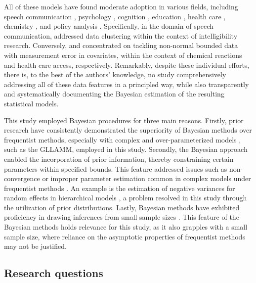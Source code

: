 \documentclass[
  authoryear,
  preprint,
  1p]{elsarticle}
\begin{document}
All of these models have found moderate adoption in various fields,
including speech communication \citep{Boonen_et_al_2023}, psychology
\citep{Unlu_et_al_2017}, cognition
\citep{Verkuilen_et_al_2012, Lopes_et_al_2023}, education
\citep{Pereira_et_al_2020}, health care
\citep{Ghosh_2019, Kangmennaang_et_al_2023}, chemistry
\citep{de_Brito_et_al_2021}, and policy analysis
\citep{Dieteren_et_al_2023, Choi_2023, Zhang_et_al_2023}. Specifically,
in the domain of speech communication, \citet{Boonen_et_al_2023}
addressed data clustering within the context of intelligibility
research. Conversely, \citet{de_Brito_et_al_2021} and
\citet{Kangmennaang_et_al_2023} concentrated on tackling non-normal
bounded data with measurement error in covariates, within the context of
chemical reactions and health care access, respectively. Remarkably,
despite these individual efforts, there is, to the best of the authors'
knowledge, no study comprehensively addressing all of these data
features in a principled way, while also transparently and
systematically documenting the Bayesian estimation of the resulting
statistical models.

{This study employed Bayesian procedures for three main reasons.
Firstly, prior research have consistently demonstrated the superiority
of Bayesian methods over frequentist methods, especially with complex
and over-parameterized models \citep{Baker_1998, Kim_et_al_1999}, such
as the GLLAMM, employed in this study. Secondly, the Bayesian approach
enabled the incorporation of prior information, thereby constraining
certain parameters within specified bounds. This feature addressed
issues such as non-convergence or improper parameter estimation common
in complex models under frequentist methods
\citep{Martin_et_al_1975, Seaman_et_al_2011}. An example is the
estimation of negative variances for random effects in hierarchical
models \citep{Holmes_et_al_2019}, a problem resolved in this study
through the utilization of prior distributions. Lastly, Bayesian methods
have exhibited proficiency in drawing inferences from small sample sizes
\citep{Baldwin_et_al_2013, Lambert_et_al_2005, Depaoli_2014}. This
feature of the Bayesian methods holds relevance for this study, as it
also grapples with a small sample size, where reliance on the asymptotic
properties of frequentist methods may not be justified.}

\subsection{Research questions}\label{sec-I-RQ}
\end{document}
